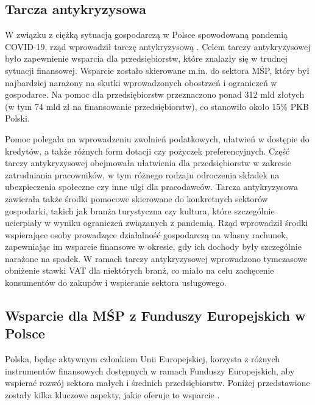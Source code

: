\documentclass[11pt]{article}
\begin{document}
\subsection*{Tarcza antykryzysowa}

W związku z ciężką sytuacją gospodarczą w Polsce spowodowaną pandemią COVID-19, rząd wprowadził tarczę antykryzysową \cite{TarczaAntykryzysowa}.
Celem tarczy antykryzysowej było zapewnienie wsparcia dla przedsiębiorstw, które znalazły się w trudnej sytuacji finansowej.
Wsparcie zostało skierowane m.in. do sektora MŚP, który był najbardziej narażony na skutki wprowadzonych obostrzeń i ograniczeń w gospodarce.
Na pomoc dla przedsiębiorstw przeznaczono ponad 312 mld złotych (w tym 74 mld zł na finansowanie przedsiębiorstw), co stanowiło około 15\% PKB Polski.

Pomoc polegała na wprowadzeniu zwolnień podatkowych, ułatwień w dostępie do kredytów, a także różnych form dotacji czy pożyczek preferencyjnych.
Część tarczy antykryzysowej obejmowała ułatwienia dla przedsiębiorstw w zakresie zatrudniania pracowników,
w tym różnego rodzaju odroczenia składek na ubezpieczenia społeczne czy inne ulgi dla pracodawców.
Tarcza antykryzysowa zawierała także środki pomocowe skierowane do konkretnych sektorów gospodarki, takich jak branża turystyczna czy kultura,
które szczególnie ucierpiały w wyniku ograniczeń związanych z pandemią.
Rząd wprowadził środki wspierające osoby prowadzące działalność gospodarczą na własny rachunek,
zapewniając im wsparcie finansowe w okresie, gdy ich dochody były szczególnie narażone na spadek.
W ramach tarczy antykryzysowej wprowadzono tymczasowe obniżenie stawki VAT dla niektórych branż,
co miało na celu zachęcenie konsumentów do zakupów i wspieranie sektora usługowego.

\subsection*{Wsparcie dla MŚP z Funduszy Europejskich w Polsce}

Polska, będąc aktywnym członkiem Unii Europejskiej, korzysta z różnych instrumentów finansowych dostępnych w ramach Funduszy Europejskich,
aby wspierać rozwój sektora małych i średnich przedsiębiorstw.
Poniżej przedstawione zostały kilka kluczowe aspekty, jakie oferuje to wsparcie \cite{FunduszeEuropejskieMŚP}.
\end{document}
